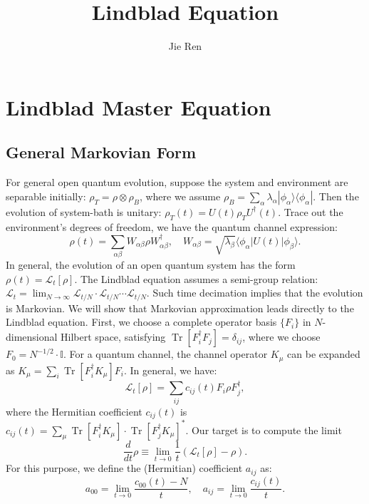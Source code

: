 \documentclass[aps,prx,superscriptaddress,nofootinbib]{revtex4}
\def \Tr{\operatorname{Tr}}
\begin{document}
\title{Lindblad Equation}
\author{Jie Ren}




\maketitle


\tableofcontents


\section{Lindblad Master Equation}
\subsection{General Markovian Form}
For general open quantum evolution, suppose the system and environment are separable initially: $\rho_T=\rho\otimes\rho_B$, where we assume $\rho_B=\sum_\alpha \lambda_\alpha |\phi_\alpha\rangle\langle\phi_\alpha |$. Then the evolution of system-bath is unitary: $\rho_T(t) = U(t)\rho_TU^\dagger(t)$. Trace out the environment's degrees of freedom, we have the quantum channel expression: 
\begin{equation}
	\rho(t) = \sum_{\alpha\beta} W_{\alpha\beta} \rho W^\dagger_{\alpha\beta},\quad 
	W_{\alpha\beta} = \sqrt{\lambda_\beta} \langle\phi_\alpha|U(t)|\phi_\beta\rangle.
\end{equation}
In general, the evolution of an open quantum system has the form $\rho(t) = \mathcal{L}_t[\rho]$. The Lindblad equation assumes a semi-group relation: $\mathcal{L}_t = \lim_{N \rightarrow \infty} \mathcal{L}_{t/N}\cdot\mathcal{L}_{t/N}\cdots \mathcal{L}_{t/N}$. Such time decimation implies that the evolution is Markovian. We will show that Markovian approximation leads directly to the Lindblad equation. First, we choose a complete operator basis $\{F_i\}$ in $N$-dimensional Hilbert space, satisfying $\Tr[F_i^\dagger F_j] = \delta_{ij}$, where we choose $F_0=N^{-1/2} \cdot\mathbb I$. For a quantum channel, the channel operator $K_\mu$ can be expanded as $K_\mu = \sum_i \Tr[F_i^\dagger K_\mu]F_i$. In general, we have:
$$
\mathcal{L}_t[\rho] = \sum_{ij}c_{ij}(t)F_i\rho F_j^\dagger,
$$
where the Hermitian coefficient $c_{ij}(t)$ is $c_{ij}(t) = \sum_{\mu} \Tr[F_i^\dagger K_\mu]\cdot \Tr[F_j^\dagger K_\mu]^*$. Our target is to compute the limit
$$
\frac{d}{dt} \rho \equiv \lim_{t\rightarrow 0} \frac{1}{t}(\mathcal{L}_t[\rho]-\rho).
$$
For this purpose, we define the (Hermitian) coefficient $a_{ij}$ as:
$$
a_{00} = \lim_{t\rightarrow 0} \frac{c_{00}(t)-N}{t}, \quad
a_{ij} = \lim_{t\rightarrow 0} \frac{c_{ij}(t)}{t}.
$$
\end{document}
